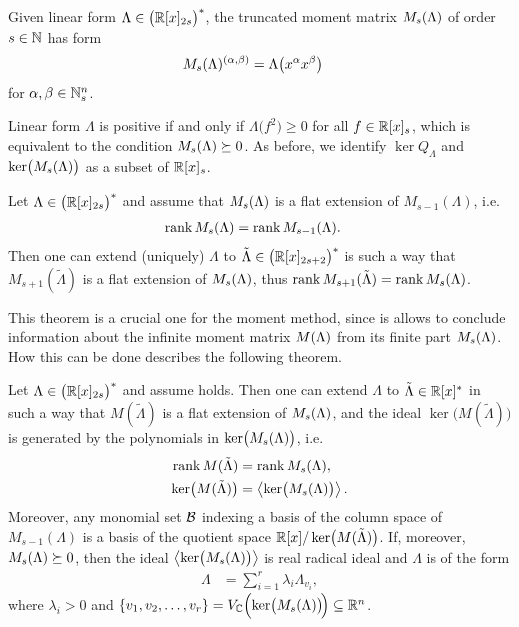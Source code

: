 \begin{definition}
  Given linear form $\Lambda\in\big(\mathbb{R}[x]_{2s}\big)^*$, the truncated moment matrix $M_s(\Lambda)$ of order $s\in\mathbb{N}$ has form
  \begin{align}
    M_s(\Lambda)^{(\alpha, \beta)} &= \Lambda\big(x^\alpha x^\beta\big)
  \end{align}
  for $\alpha, \beta \in\mathbb{N}_s^n$.
\end{definition}

Linear form $\Lambda$ is positive if and only if $\Lambda\big(f^2\big)\geq0$ for all $f\in\mathbb{R}[x]_s$, which is equivalent to the condition $M_s(\Lambda)\succeq0$.
As before, we identify $\ker Q_\Lambda$ and $\operatorname{ker}\!\big(M_s(\Lambda)\big)$ as a subset of $\mathbb{R}[x]_s$.

\begin{theorem}
  Let $\Lambda\in\big(\mathbb{R}[x]_{2s}\big)^*$ and assume that $M_s(\Lambda)$ is a flat extension of $M_{s-1}(\Lambda)$, i.e.
  \begin{align}
    \rank\MLs &= \rank M_{s-1}(\Lambda).\labeleq{POP:sol:flat}
  \end{align}
  Then one can extend (uniquely) $\Lambda$ to $\tilde{\Lambda}\in\big(\mathbb{R}[x]_{2s+2}\big)^*$ is such a way that $M_{s+1}(\tilde{\Lambda})$ is a flat extension of $M_s(\Lambda)$, thus $\operatorname{rank} M_{s+1}(\tilde{\Lambda})=\operatorname{rank}M_s(\Lambda)$.
\end{theorem}

This theorem is a crucial one for the moment method, since is allows to conclude information about the infinite moment matrix $M(\Lambda)$ from its finite part $M_s(\Lambda)$.
How this can be done describes the following theorem.

\begin{theorem}
  Let $\Lambda\in\big(\mathbb{R}[x]_{2s}\big)^*$ and assume  holds.
  Then one can extend $\Lambda$ to $\tilde{\Lambda}\in\mathbb{R}[x]^*$ in such a way that $M(\tilde{\Lambda})$ is a flat extension of $M_s(\Lambda)$, and the ideal $\ker\!\big(M(\tilde{\Lambda})\big)$ is generated by the polynomials in $\operatorname{ker}\!\big(M_s(\Lambda)\big)$, i.e.
  \begin{align}
    \operatorname{rank} M(\tilde{\Lambda}) &= \operatorname{rank} M_s(\Lambda),\\
    \operatorname{ker}\!\big(M(\tilde{\Lambda})\big) &= \left<\operatorname{ker}\!\big(M_s(\Lambda)\big) \right> .
  \end{align}
  Moreover, any monomial set $\mathcal{B}$ indexing a basis of the column space of $M_{s-1}(\Lambda)$ is a basis of the quotient space $\mathbb{R}[x]/\operatorname{ker}\!\big(M(\tilde{\Lambda})\big)$. If, moreover, $M_s(\Lambda) \succeq 0$, then the ideal $\left<\operatorname{ker}\!\big(M_s(\Lambda)\big) \right>$ is real radical ideal and $\Lambda$ is of the form
  \begin{align}
    \Lambda &= \sum_{i=1}^r \lambda_i \Lambda_{v_i},
  \end{align}
  where $\lambda_i>0$ and $\{v_1, v_2, \ldots, v_r\}=V_{\mathbb{C}}\Big(\!\operatorname{ker}\!\big(M_s(\Lambda)\big)\!\Big)\subseteq\mathbb{R}^n$.
\end{theorem}

